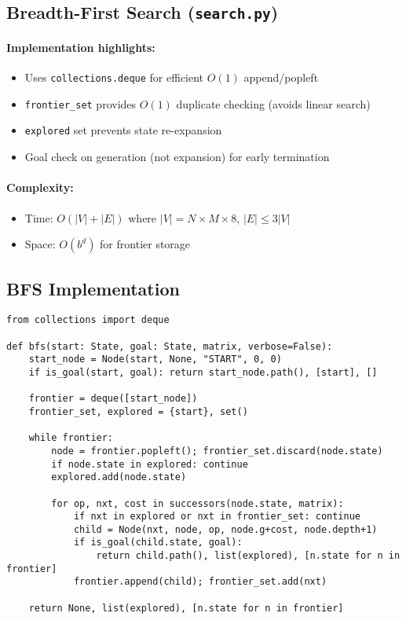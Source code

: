 \documentclass[11pt,a4paper]{article}
\begin{document}
\subsection{Breadth-First Search (\texttt{search.py})}
\paragraph{Implementation highlights:}
\begin{itemize}[leftmargin=1.5cm,itemsep=0.1em]
    \item Uses \texttt{collections.deque} for efficient $O(1)$ append/popleft
    \item \texttt{frontier\_set} provides $O(1)$ duplicate checking (avoids linear search)
    \item \texttt{explored} set prevents state re-expansion
    \item Goal check on generation (not expansion) for early termination
\end{itemize}

\paragraph{Complexity:}
\begin{itemize}[leftmargin=1.5cm,itemsep=0.1em]
    \item Time: $O(|V| + |E|)$ where $|V| = N \times M \times 8$, $|E| \leq 3|V|$
    \item Space: $O(b^d)$ for frontier storage
\end{itemize}

\subsection{BFS Implementation}
\begin{lstlisting}
from collections import deque

def bfs(start: State, goal: State, matrix, verbose=False):
    start_node = Node(start, None, "START", 0, 0)
    if is_goal(start, goal): return start_node.path(), [start], []
    
    frontier = deque([start_node])
    frontier_set, explored = {start}, set()
    
    while frontier:
        node = frontier.popleft(); frontier_set.discard(node.state)
        if node.state in explored: continue
        explored.add(node.state)
        
        for op, nxt, cost in successors(node.state, matrix):
            if nxt in explored or nxt in frontier_set: continue
            child = Node(nxt, node, op, node.g+cost, node.depth+1)
            if is_goal(child.state, goal):
                return child.path(), list(explored), [n.state for n in frontier]
            frontier.append(child); frontier_set.add(nxt)
    
    return None, list(explored), [n.state for n in frontier]
\end{lstlisting}
\end{document}

